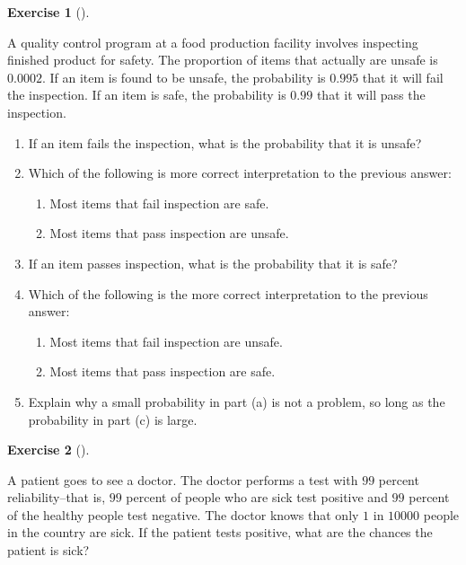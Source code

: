 \documentclass[
  letterpaper,
  DIV=11,
  numbers=noendperiod]{scrreprt}
\providecommand{\tightlist}{%
  \setlength{\itemsep}{0pt}\setlength{\parskip}{0pt}}\usepackage{longtable,booktabs,array}
\theoremstyle{definition}
\newtheorem{exercise}{Exercise}[chapter]
\theoremstyle{definition}
\theoremstyle{definition}
\theoremstyle{remark}
\begin{document}
\begin{exercise}[]\protect\hypertarget{exr-4.11}{}\label{exr-4.11}

A quality control program at a food production facility involves
inspecting finished product for safety. The proportion of items that
actually are unsafe is \(0.0002\). If an item is found to be unsafe, the
probability is \(0.995\) that it will fail the inspection. If an item is
safe, the probability is \(0.99\) that it will pass the inspection.

\begin{enumerate}
\def\labelenumi{\alph{enumi}.}
\tightlist
\item
  If an item fails the inspection, what is the probability that it is
  unsafe?
\item
  Which of the following is more correct interpretation to the previous
  answer:

  \begin{enumerate}
  \def\labelenumii{\roman{enumii}.}
  \tightlist
  \item
    Most items that fail inspection are safe.
  \item
    Most items that pass inspection are unsafe.
  \end{enumerate}
\item
  If an item passes inspection, what is the probability that it is safe?
\item
  Which of the following is the more correct interpretation to the
  previous answer:

  \begin{enumerate}
  \def\labelenumii{\roman{enumii}.}
  \tightlist
  \item
    Most items that fail inspection are unsafe.
  \item
    Most items that pass inspection are safe.
  \end{enumerate}
\item
  Explain why a small probability in part (a) is not a problem, so long
  as the probability in part (c) is large.
\end{enumerate}

\end{exercise}

\begin{exercise}[]\protect\hypertarget{exr-4.12}{}\label{exr-4.12}

A patient goes to see a doctor. The doctor performs a test with \(99\)
percent reliability--that is, \(99\) percent of people who are sick test
positive and \(99\) percent of the healthy people test negative. The
doctor knows that only \(1\) in \(10000\) people in the country are
sick. If the patient tests positive, what are the chances the patient is
sick?

\end{exercise}
\end{document}
